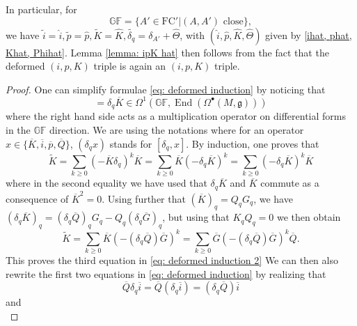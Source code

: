 \documentclass[11pt,a4paper]{amsart}
\theoremstyle{plain} %
\theoremstyle{definition}
\theoremstyle{remark}
\newcommand{\g}{\mathfrak{g}}
\newcommand{\wh}{\widehat}
\newcommand{\FC}{\mathrm{FC}}
\newcommand{\Kb}{\overline{K}}
\newcommand{\ib}{\overline{i}}
\newcommand{\pb}{\overline{p}}
\newcommand{\Qb}{\overline{Q}}
\newcommand{\Gb}{\overline{G}}
\begin{document}
In particular, for 
\begin{equation}\label{GF as A' close to A}
\mathbb{GF} = \{A' \in \FC'| (A,A') \text{ close}\},    
\end{equation} 
we have $\widetilde{i} = \wh{i}, \widetilde{p} = \wh{p}, \widetilde{K} =\wh{K}, \widetilde{\delta_q} =\delta_{A'} + \wh{\Theta}$, with $(\wh{i},\wh{p},\wh{K},\wh{\Theta})$ given by \eqref{ihat, phat, Khat, Phihat}. Lemma \ref{lemma: ipK hat} then follows from the fact that the deformed $(i,p,K)$ triple is again an $(i,p,K)$ triple.  \\
\begin{proof}
One can simplify formulae \eqref{eq: deformed induction} by noticing that \begin{equation} [\delta_q, \Kb] = \delta_q\Kb \in \Omega^1(\mathbb{GF},\operatorname{End}(\Omega^\bullet(M,\g)))
\end{equation} 
where the right hand side acts as a multiplication operator on differential forms in the $\mathbb{GF}$ direction. 
We are using the notations where for an operator $x\in \{\Kb,\ib,\pb,\Qb\}$, $(\delta_q x)$ stands for $[\delta_q,x]$. By induction, one proves that 
\begin{equation}
\widetilde{K} = \sum_{k \geq 0} (-\Kb  \delta_q)^k \Kb = \sum_{k \geq 0}\Kb  (-\delta_q \Kb)^k = \sum_{k \geq 0} (-\delta_q \Kb)^k \Kb
\end{equation}
where in the second equality we have used that $\delta_q \Kb$ and $\Kb$ commute as a consequence of $\Kb^2=0$.
 Using further that  $(\Kb)_q = Q_q G_q$, we have $(\delta_q \Kb)_q = (\delta_q\Qb)_q G_q - Q_q (\delta_q \Gb)_q$, but using that $K_q  Q_q = 0$ we then obtain
 \begin{equation}\label{eq: K tilde}
     \widetilde{K}=\sum_{k \geq 0} \Kb ( -(\delta_q \Qb) \Gb)^k  = \sum_{k \geq 0} \Gb (- (\delta_q \Qb)  \Gb)^k \Qb.
 \end{equation}
 This proves the third equation in \eqref{eq: deformed induction 2}
 We can then also rewrite the first two equations in \eqref{eq: deformed induction} by realizing that 
 \begin{equation}\label{eq: Q delta i}
     \Qb \delta_q \ib = \Qb  (\delta_q\ib) =  (\delta_q \Qb)  \ib
 \end{equation}
 and 
 \begin{equation}\label{eq: p delta Q}

\end{equation}
\end{proof}
\end{document}
